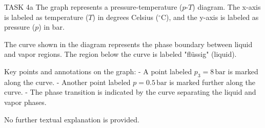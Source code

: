 TASK 4a  
The graph represents a pressure-temperature (\( p \)-\( T \)) diagram. The x-axis is labeled as temperature (\( T \)) in degrees Celsius (\( ^\circ\text{C} \)), and the y-axis is labeled as pressure (\( p \)) in bar.  

The curve shown in the diagram represents the phase boundary between liquid and vapor regions. The region below the curve is labeled "flüssig" (liquid).  

Key points and annotations on the graph:  
- A point labeled \( p_3 = 8 \, \text{bar} \) is marked along the curve.  
- Another point labeled \( p = 0.5 \, \text{bar} \) is marked further along the curve.  
- The phase transition is indicated by the curve separating the liquid and vapor phases.  

No further textual explanation is provided.